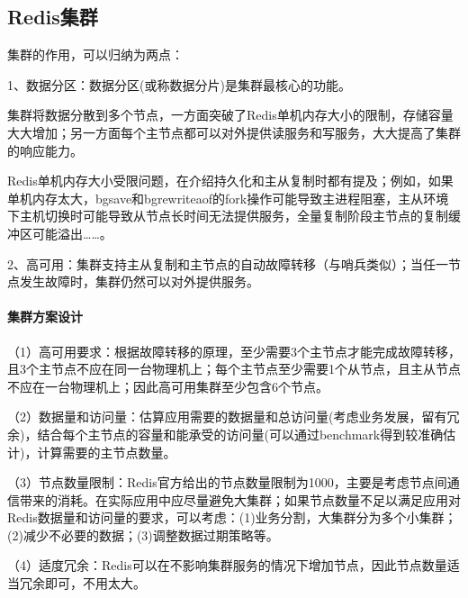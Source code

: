 \documentclass[../../../interview-questions.tex]{subfiles}
\begin{document}
\subsection{Redis集群}

集群的作用，可以归纳为两点：

1、数据分区：数据分区(或称数据分片)是集群最核心的功能。

集群将数据分散到多个节点，一方面突破了Redis单机内存大小的限制，存储容量大大增加；另一方面每个主节点都可以对外提供读服务和写服务，大大提高了集群的响应能力。

Redis单机内存大小受限问题，在介绍持久化和主从复制时都有提及；例如，如果单机内存太大，bgsave和bgrewriteaof的fork操作可能导致主进程阻塞，主从环境下主机切换时可能导致从节点长时间无法提供服务，全量复制阶段主节点的复制缓冲区可能溢出……。

2、高可用：集群支持主从复制和主节点的自动故障转移（与哨兵类似）；当任一节点发生故障时，集群仍然可以对外提供服务。

\paragraph{集群方案设计}

（1）高可用要求：根据故障转移的原理，至少需要3个主节点才能完成故障转移，且3个主节点不应在同一台物理机上；每个主节点至少需要1个从节点，且主从节点不应在一台物理机上；因此高可用集群至少包含6个节点。

（2）数据量和访问量：估算应用需要的数据量和总访问量(考虑业务发展，留有冗余)，结合每个主节点的容量和能承受的访问量(可以通过benchmark得到较准确估计)，计算需要的主节点数量。

（3）节点数量限制：Redis官方给出的节点数量限制为1000，主要是考虑节点间通信带来的消耗。在实际应用中应尽量避免大集群；如果节点数量不足以满足应用对Redis数据量和访问量的要求，可以考虑：(1)业务分割，大集群分为多个小集群；(2)减少不必要的数据；(3)调整数据过期策略等。

（4）适度冗余：Redis可以在不影响集群服务的情况下增加节点，因此节点数量适当冗余即可，不用太大。
\end{document}
